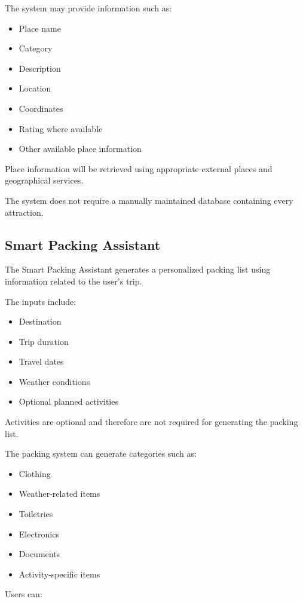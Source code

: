 \documentclass[11pt,a4paper]{article}
\begin{document}
The system may provide information such as:

\begin{itemize}
\item Place name
\item Category
\item Description
\item Location
\item Coordinates
\item Rating where available
\item Other available place information
\end{itemize}

Place information will be retrieved using appropriate external places and geographical services.

The system does not require a manually maintained database containing every attraction.


\subsection{Smart Packing Assistant}

The Smart Packing Assistant generates a personalized packing list using information related to the user's trip.

The inputs include:

\begin{itemize}
\item Destination
\item Trip duration
\item Travel dates
\item Weather conditions
\item Optional planned activities
\end{itemize}

Activities are optional and therefore are not required for generating the packing list.

The packing system can generate categories such as:

\begin{itemize}
\item Clothing
\item Weather-related items
\item Toiletries
\item Electronics
\item Documents
\item Activity-specific items
\end{itemize}

Users can:
\end{document}
